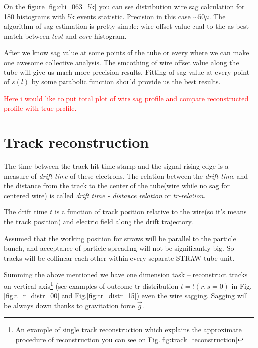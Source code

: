 \documentclass[]{article}
\begin{document}
	
	On the figure \ref{fig:chi_063_5k} you can see distribution wire sag calculation for 180 histograms with 5k events statistic. Precision in this case  $\sim 50\mu$. The algorithm of sag estimation is pretty simple: wire offset value eual to the as best match between $test$ and $core$ histogram.

	After we know sag value at some points of the tube or every where we can make one awesome collective analysis. The smoothing of wire offset value along the tube will give us much more precision results.  Fitting of sag value at  every point of $s(l)$ by some parabolic function should provide us the best results.
	
	\textcolor{red}{ Here i would like to put total plot of wire sag profile and compare reconstructed profile with true profile.}
	
	
	\section{Track reconstruction}
	
	The time between the track hit time stamp and the signal rising edge is a measure of {\it drift time} of these electrons. The relation between the   {\it drift time} and  the distance from the track to the center of the tube(wire while no sag for centered wire) is called {\it drift time - distance relation} or {\it tr-relation}.
	
	The drift time $t$ is a function of track position relative to the wire(so it's means the track position) and electric field along the drift trajectory.
	
	Assumed that the working  position  for straws will be parallel to the particle bunch, and  acceptance of particle spreading will not be significantly big. So tracks will be collinear each other within every separate  STRAW tube unit.
	
	Summing the above mentioned we have one dimension task -- reconstruct tracks on vertical axis\footnote{An example of single track reconstruction which explains the approximate procedure of reconstruction you can see on Fig.\ref{fig:track_reconstruction}}	(see examples of outcome tr-distribution $t = t(r,s=0)$ in Fig.\ref{fig:t_r_distr_00} and Fig.\ref{fig:tr_distr_15})  even the wire sagging. Sagging will be always down thanks to gravitation force $\vec{g}$.
	
\end{document}
